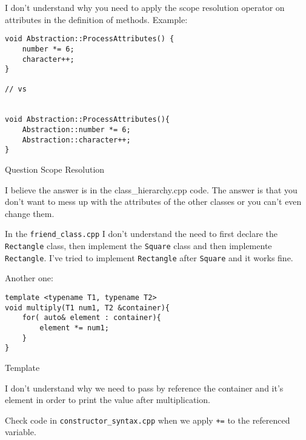 \documentclass[11pt, a4paper]{article}
\begin{document}
I don't understand why you need to apply the scope resolution operator on attributes in the definition of methods. Example:


\begin{listing}[hbt!]
\begin{verbatim}
void Abstraction::ProcessAttributes() {
    number *= 6;
    character++;
}

// vs


void Abstraction::ProcessAttributes(){
	Abstraction::number *= 6;
	Abstraction::character++;
}
\end{verbatim}
\caption{Question Scope Resolution}
\label{lst:question_scope_resolution}
\end{listing}

I believe the answer is in the class\_hierarchy.cpp code. The answer is that you don't want to mess up with the attributes of the other classes or you can't even change them.





In the \texttt{friend\_class.cpp} I don't understand the need to first declare the \texttt{Rectangle} class, then implement the \texttt{Square} class and then implemente \texttt{Rectangle}. I've tried to implement \texttt{Rectangle} after \texttt{Square} and it works fine.




Another one:
\begin{listing}[hbt!]
\begin{verbatim}
template <typename T1, typename T2>
void multiply(T1 num1, T2 &container){
	for( auto& element : container){
		element *= num1;	
	}
}
\end{verbatim}
\caption{Template}
\label{lst:template}
\end{listing}

I don't understand why we need to pass by reference the container and it's element in order to print the value after multiplication.

Check code in \texttt{constructor\_syntax.cpp} when we apply \texttt{+=} to the referenced variable.
\end{document}
